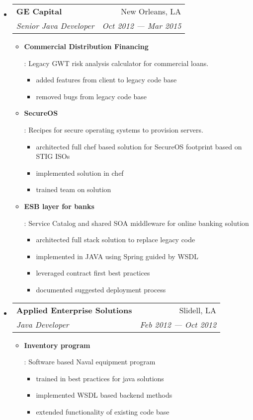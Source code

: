 \documentclass[letterpaper, 10pt]{extarticle}
\makeatletter
\newcommand{\resumeItem}[2]{
\item\small{
    \textbf{#1}{: #2 \vspace{-2pt}}
  }
}
\newcommand{\resumeSubheading}[4]{
  \vspace{-1pt}\item{
    \begin{tabular*}{0.97\textwidth}{l@{\extracolsep{\fill}}r}
      \textbf{#1} & #2 \\
      \textit{\small#3} & \textit{\small #4} \\
    \end{tabular*}\vspace{-5pt}}
}
\newcommand{\resumeSubHeadingListStart}{\begin{itemize}[leftmargin=*]}
\newcommand{\resumeSubHeadingListEnd}{\end{itemize}}
\newcommand{\resumeItemListStart}{\justify\begin{itemize}}
\newcommand{\resumeItemListEnd}{\end{itemize}\vspace{-5pt}}
\makeatother
\begin{document}
\resumeSubHeadingListStart
\resumeSubheading
{GE Capital}{New Orleans, LA}
{Senior Java Developer}{Oct 2012 --- Mar 2015}
\resumeItemListStart
\resumeItem{Commercial Distribution Financing}
{Legacy GWT risk analysis calculator for commercial loans.

  \begin{itemize}
    \item added features from client to legacy code base
    \item removed bugs from legacy code base
  \end{itemize}

}

\resumeItem{SecureOS}
{Recipes for secure operating systems to provision servers.

  \begin{itemize}
    \item architected full chef based solution for SecureOS footprint based on STIG ISOs
    \item implemented solution in chef
    \item trained team on solution
  \end{itemize}

}

\resumeItem{ESB layer for banks}
{Service Catalog and shared SOA middleware for online banking solution

  \begin{itemize}
    \item architected full stack solution to replace legacy code
    \item implemented in JAVA using Spring guided by WSDL
    \item leveraged contract first best practices
    \item documented suggested deployment process
  \end{itemize}

}
\resumeItemListEnd
\resumeSubHeadingListEnd

\resumeSubHeadingListStart
\resumeSubheading
{Applied Enterprise Solutions}{Slidell, LA}
{Java Developer}{Feb 2012 --- Oct 2012}
\resumeItemListStart
\resumeItem{Inventory program}
{Software based Naval equipment program

  \begin{itemize}
    \item trained in best practices for java solutions
    \item implemented WSDL based backend methods
    \item extended functionality of existing code base
  \end{itemize}

}
\resumeItemListEnd
\resumeSubHeadingListEnd
\end{document}
